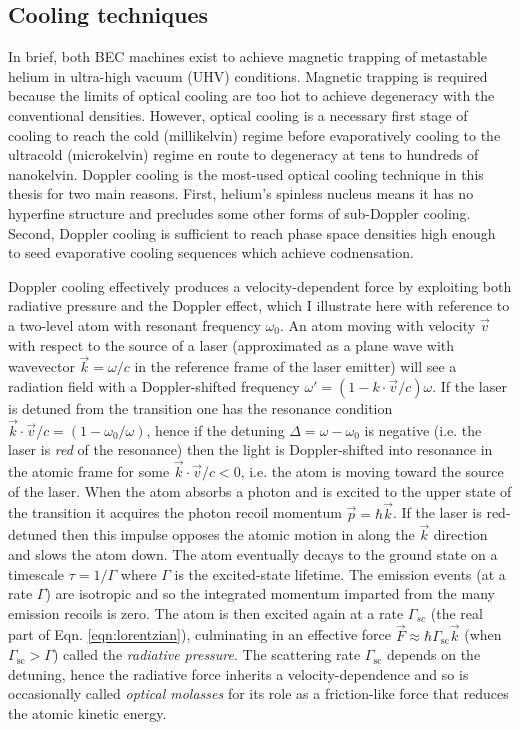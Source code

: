 \subsection{Cooling techniques}
	\label{sec:doppler_basics}
	In brief, both BEC machines exist to achieve magnetic trapping of metastable helium in ultra-high vacuum (UHV) conditions.
	Magnetic trapping is required because the limits of optical cooling are too hot to achieve degeneracy with the conventional densities.
	However, optical cooling is a necessary first stage of cooling to reach the cold (millikelvin) regime before evaporatively cooling to the ultracold (microkelvin) regime en route to degeneracy at tens to hundreds of nanokelvin.
	Doppler cooling is the most-used optical cooling technique in this thesis for two main reasons.
	First, helium's spinless nucleus means it has no hyperfine structure and precludes some other forms of sub-Doppler cooling.
	Second, Doppler cooling is sufficient to reach phase space densities high enough to seed evaporative cooling sequences which achieve codnensation. 
	
	Doppler cooling effectively produces a velocity-dependent force by exploiting both radiative pressure and the Doppler effect, which I illustrate here with reference to a two-level atom with resonant frequency $\omega_0$.
	An atom moving with velocity $\vec{v}$ with respect to the source of a laser (approximated as a plane wave with wavevector $\vec{k} = \omega/c$ in the reference frame of the laser emitter) will see a radiation field with a Doppler-shifted frequency $\omega' = (1 - k\cdot \vec{v}/c)\omega$.
	If the laser is detuned from the transition one has the resonance condition $\vec{k} \cdot \vec{v}/c = (1 - \omega_0/\omega)$, hence if the detuning $\Delta = \omega-\omega_0$ is negative (i.e. the laser is \emph{red} of the resonance) then the light is Doppler-shifted into resonance in the atomic frame for some $\vec{k} \cdot \vec{v}/c<0$, i.e. the atom is moving toward the source of the laser. 
	When the atom absorbs a photon and is excited to the upper state of the transition it acquires the photon recoil momentum $\vec{p} = \hbar \vec{k}$.
	If the laser is red-detuned then this impulse opposes the atomic motion in along the $\vec{k}$ direction and slows the atom down.
	The atom eventually decays to the ground state on a timescale $\tau = 1/\Gamma$ where $\Gamma$ is the excited-state lifetime.
	The emission events (at a rate $\Gamma$) are isotropic and so the integrated momentum imparted from the many emission recoils is zero.
	The atom is then excited again at a rate $\Gamma_{sc}$ (the real part of Eqn. \ref{eqn:lorentzian}), culminating in an effective force $\vec{F} \approx \hbar\Gamma_\textrm{sc}\vec{k}$ (when $\Gamma_\textrm{sc}>\Gamma$) called the \emph{radiative pressure}.
	The scattering rate $\Gamma_\textrm{sc}$ depends on the detuning, hence the radiative force inherits a velocity-dependence and so is occasionally called \emph{optical molasses} for its role as a friction-like force that reduces the atomic kinetic energy.

